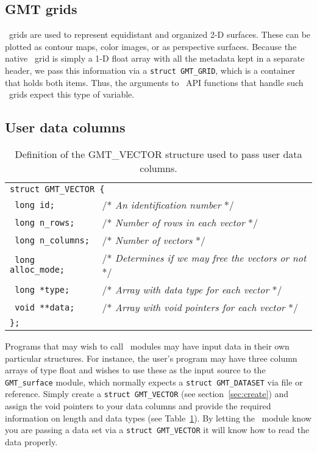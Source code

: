 \documentclass{report}
\begin{document}
\subsection{GMT grids}

\GMT\ grids are used to represent equidistant and organized 2-D surfaces.  These can be
plotted as contour maps, color images, or as perspective surfaces.  Because the native
\GMT\ grid is simply a 1-D float array with all the metadata kept in a separate header, we
pass this information via a \texttt{struct GMT\_GRID}, which is a container that holds both items.
Thus, the arguments to \GMT\ API functions that handle such \GMT\ grids expect this type
of variable.

\subsection{User data columns}

\begin{table}[h]
\small
\centering
\begin{tabular}{ll} \hline
\multicolumn{2}{l}{\texttt{struct GMT\_VECTOR \{}} \\ 
\texttt{	long id;}		&       /* {\it An identification number} */ \\
\texttt{	long n\_rows;}		&       /* {\it Number of rows in each vector} */ \\
\texttt{	long n\_columns;}	&       /* {\it Number of vectors}  */\\
\texttt{	long alloc\_mode;}	&       /* {\it Determines if we may free the vectors or not}  */\\
\texttt{	long *type;}		&       /* {\it Array with data type for each vector}  */\\
\texttt{	void **data;}		&       /* {\it Array with void pointers for each vector}  */\\
\texttt{\};}	&        \\  \hline
\end{tabular}
\caption{Definition of the GMT\_VECTOR structure used to pass user data columns.}
\label{tbl:vector}
\end{table}
\noindent
Programs that may wish to call \GMT\ modules may have input data in their own particular
structures.  For instance, the user's program may have three column arrays of type float
and wishes to use these as the input source to the \texttt{GMT\_surface} module, which normally
expects a \texttt{struct GMT\_DATASET} via file or reference.  Simply create a \texttt{struct GMT\_VECTOR}
(see section~\ref{sec:create}) and assign the void pointers to your data columns and provide
the required information on length and data types (see Table~\ref{tbl:vector}).
By letting the \GMT\ module know you are passing a data set via a \texttt{struct GMT\_VECTOR} it will know how to
read the data properly.
\end{document}
